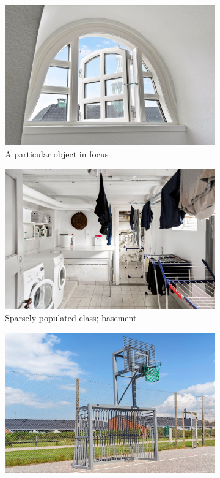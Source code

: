 \begin{figure}[H]
    \centering
    \begin{subfigure}[b]{0.4\textwidth}
      \includegraphics[width=\textwidth]{pictures/random/awindow}
      \caption{A particular object in focus}
      \label{fig:1}
    \end{subfigure}
    \begin{subfigure}[b]{0.4\textwidth}
      \includegraphics[width=\textwidth]{pictures/random/basement}
      \caption{Sparsely populated class; basement}
      \label{fig:2}
    \end{subfigure}
    \begin{subfigure}[b]{0.4\textwidth}
      \includegraphics[width=\textwidth]{pictures/random/public}

\end{subfigure}
\end{figure}

